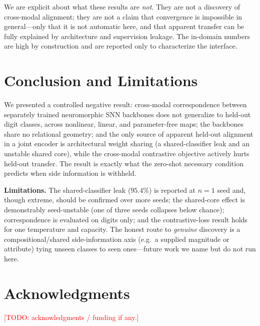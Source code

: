 \documentclass[conference]{IEEEtran}
\newcommand{\todo}[1]{\textcolor{red}{[TODO: #1]}}
\begin{document}
We are explicit about what these results are \emph{not}. They are not a
discovery of cross-modal alignment; they are not a claim that convergence
is impossible in general---only that it is not automatic here, and that
apparent transfer can be fully explained by architecture and supervision
leakage. The in-domain numbers are high by construction and are reported
only to characterize the interface.

\section{Conclusion and Limitations}\label{sec:conc}
We presented a controlled negative result: cross-modal correspondence
between separately trained neuromorphic SNN backbones does not generalize
to held-out digit classes, across nonlinear, linear, and parameter-free
maps; the backbones share no relational geometry; and the only source of
apparent held-out alignment in a joint encoder is architectural weight
sharing (a shared-classifier leak and an unstable shared core), while the
cross-modal contrastive objective actively hurts held-out transfer. The
result is exactly what the zero-shot necessary condition predicts when
side information is withheld.

\noindent\textbf{Limitations.}
The shared-classifier leak ($95.4\%$) is reported at $n{=}1$ seed and,
though extreme, should be confirmed over more seeds; the shared-core effect
is demonstrably seed-unstable (one of three seeds collapses below chance);
correspondence is evaluated on digits only; and the contrastive-loss
result holds for one temperature and capacity. The honest route to
\emph{genuine} discovery is a compositional/shared side-information axis
(e.g.\ a supplied magnitude or attribute) tying unseen classes to seen
ones---future work we name but do not run here.

\section*{Acknowledgments}
\todo{acknowledgments / funding if any.}
\end{document}
